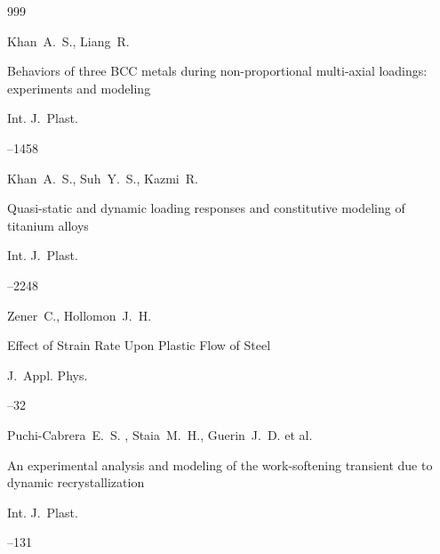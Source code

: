 \begin{thebibliography}{999}

\by Khan~A.~S., Liang~R.


\paper Behaviors of three BCC metals during non-proportional multi-axial loadings: experiments and modeling



\jour  Int. J.~Plast. 

–1458






\by Khan~A.~S., Suh~Y.~S., Kazmi~R.


\paper Quasi-static and dynamic loading responses and constitutive modeling of titanium alloys

\jour Int. J.~Plast. 



–2248








\by Zener~C., Hollomon~J.~H.


\paper Effect of Strain Rate Upon Plastic Flow of Steel

\jour J.~Appl. Phys.



–32





\by Puchi-Cabrera~E.~S. , Staia~M.~H.,  Guerin~J.~D. et al.

\paper An experimental analysis and modeling of the work-softening transient due to dynamic recrystallization

\jour Int. J.~Plast.



–131


\end{thebibliography}
